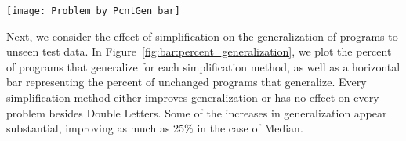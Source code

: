 
\begin{figure*}[t] %
\centering
\texttt{[image: Problem\_by\_PcntGen\_bar]} %
\caption{The proportion of simplified programs that generalize to unseen data
	for each problem, with the proportion of unchanged programs that generalize 
	indicated with black horizontal bars.
    The number of unchanged programs taken into account for each problem
    is given in parentheses, representing the number of starting points for each problem.
}
\label{fig:bar:percent_generalization}
\end{figure*}

Next, we consider the effect of simplification on the generalization of programs to unseen test data. In Figure~\ref{fig:bar:percent_generalization}, we plot the percent of programs that generalize for each simplification method, as well as a horizontal bar representing the percent of unchanged programs that generalize.
Every simplification method either improves generalization or has no effect on every problem besides Double Letters.
 Some of the increases in generalization appear substantial, 
improving as much as 25\% in the case of Median.


